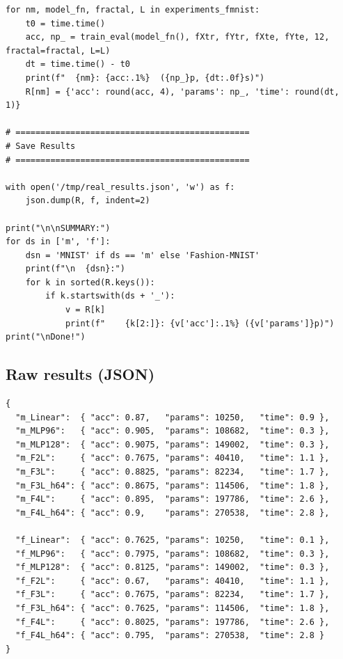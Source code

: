 \documentclass[11pt,a4paper]{report}
\begin{document}
\begin{small}
\begin{verbatim}
for nm, model_fn, fractal, L in experiments_fmnist:
    t0 = time.time()
    acc, np_ = train_eval(model_fn(), fXtr, fYtr, fXte, fYte, 12, fractal=fractal, L=L)
    dt = time.time() - t0
    print(f"  {nm}: {acc:.1%}  ({np_}p, {dt:.0f}s)")
    R[nm] = {'acc': round(acc, 4), 'params': np_, 'time': round(dt, 1)}

# ===============================================
# Save Results
# ===============================================

with open('/tmp/real_results.json', 'w') as f:
    json.dump(R, f, indent=2)

print("\n\nSUMMARY:")
for ds in ['m', 'f']:
    dsn = 'MNIST' if ds == 'm' else 'Fashion-MNIST'
    print(f"\n  {dsn}:")
    for k in sorted(R.keys()):
        if k.startswith(ds + '_'):
            v = R[k]
            print(f"    {k[2:]}: {v['acc']:.1%} ({v['params']}p)")
print("\nDone!")
\end{verbatim}
\end{small}

\subsection{Raw results (JSON)}

\begin{small}
\begin{verbatim}
{
  "m_Linear":  { "acc": 0.87,   "params": 10250,   "time": 0.9 },
  "m_MLP96":   { "acc": 0.905,  "params": 108682,  "time": 0.3 },
  "m_MLP128":  { "acc": 0.9075, "params": 149002,  "time": 0.3 },
  "m_F2L":     { "acc": 0.7675, "params": 40410,   "time": 1.1 },
  "m_F3L":     { "acc": 0.8825, "params": 82234,   "time": 1.7 },
  "m_F3L_h64": { "acc": 0.8675, "params": 114506,  "time": 1.8 },
  "m_F4L":     { "acc": 0.895,  "params": 197786,  "time": 2.6 },
  "m_F4L_h64": { "acc": 0.9,    "params": 270538,  "time": 2.8 },

  "f_Linear":  { "acc": 0.7625, "params": 10250,   "time": 0.1 },
  "f_MLP96":   { "acc": 0.7975, "params": 108682,  "time": 0.3 },
  "f_MLP128":  { "acc": 0.8125, "params": 149002,  "time": 0.3 },
  "f_F2L":     { "acc": 0.67,   "params": 40410,   "time": 1.1 },
  "f_F3L":     { "acc": 0.7675, "params": 82234,   "time": 1.7 },
  "f_F3L_h64": { "acc": 0.7625, "params": 114506,  "time": 1.8 },
  "f_F4L":     { "acc": 0.8025, "params": 197786,  "time": 2.6 },
  "f_F4L_h64": { "acc": 0.795,  "params": 270538,  "time": 2.8 }
}
\end{verbatim}
\end{small}
\end{document}
